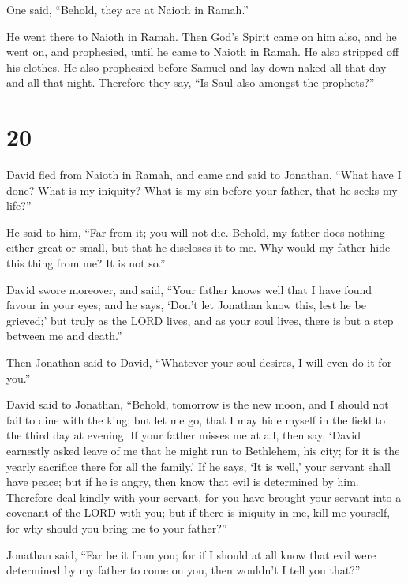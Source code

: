One said, ``Behold, they are at Naioth in Ramah.''

 He went there to Naioth in Ramah. Then God's Spirit came
on him also, and he went on, and prophesied, until he came to Naioth in
Ramah.  He also stripped off his clothes. He also
prophesied before Samuel and lay down naked all that day and all that
night. Therefore they say, ``Is Saul also amongst the prophets?''

\hypertarget{section-19}{%
\section{20}\label{section-19}}

 David fled from Naioth in Ramah, and came and said to
Jonathan, ``What have I done? What is my iniquity? What is my sin before
your father, that he seeks my life?''

 He said to him, ``Far from it; you will not die. Behold, my
father does nothing either great or small, but that he discloses it to
me. Why would my father hide this thing from me? It is not so.''

 David swore moreover, and said, ``Your father knows well
that I have found favour in your eyes; and he says, `Don't let Jonathan
know this, lest he be grieved;' but truly as the LORD lives, and as your
soul lives, there is but a step between me and death.''

 Then Jonathan said to David, ``Whatever your soul desires,
I will even do it for you.''

 David said to Jonathan, ``Behold, tomorrow is the new moon,
and I should not fail to dine with the king; but let me go, that I may
hide myself in the field to the third day at evening.  If
your father misses me at all, then say, `David earnestly asked leave of
me that he might run to Bethlehem, his city; for it is the yearly
sacrifice there for all the family.'  If he says, `It is
well,' your servant shall have peace; but if he is angry, then know that
evil is determined by him.  Therefore deal kindly with your
servant, for you have brought your servant into a covenant of the LORD
with you; but if there is iniquity in me, kill me yourself, for why
should you bring me to your father?''

 Jonathan said, ``Far be it from you; for if I should at all
know that evil were determined by my father to come on you, then
wouldn't I tell you that?''

